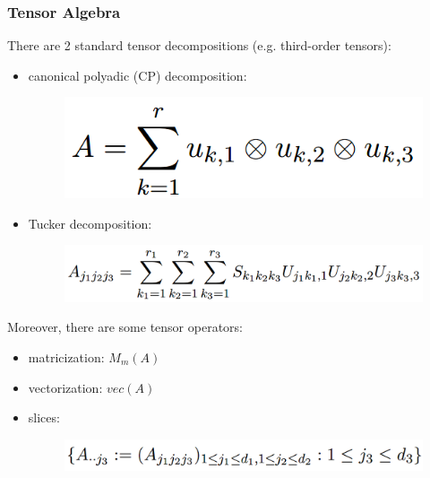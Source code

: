 \documentclass{beamer}
\begin{document}
	\begin{frame}
		\frametitle{Tensor Algebra}
		There are 2 standard tensor decompositions (e.g. third-order tensors):
		\begin{itemize}
			\item
			canonical polyadic (CP) decomposition:
			\begin{figure}
				\includegraphics[width=.4\linewidth]{image001.png}
			\end{figure}
			\item
			Tucker decomposition:
			\begin{figure}
				\includegraphics[width=.7\linewidth]{image002.png}
			\end{figure}
		\end{itemize}
		Moreover, there are some tensor operators:
		\begin{itemize}
			\item
			matricization: $M_m(A)$
			\item
			vectorization: $vec(A)$
			\item
			slices:
			 \begin{figure}
			 	\includegraphics[width=.7\linewidth]{image003.png}
			 \end{figure}
		\end{itemize}
	\end{frame}
	
\end{document}
